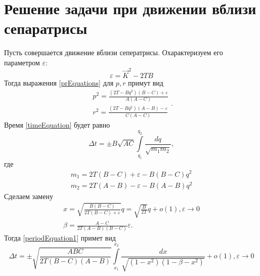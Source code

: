 \documentclass{article}
\begin{document}
\section{Решение задачи при движении вблизи сепаратрисы}
Пусть совершается движение вблизи сеператрисы. Охарактеризуем его параметром \begin{math} \varepsilon \end{math}:
\begin{equation}
\varepsilon=\vec{K}^2-2TB
\end{equation}
Тогда выражения \ref{prEquations} для \begin{math} p, r \end{math} примут вид
\begin{equation}
\begin{array}{l}
p^2=\frac{(2T-Bq^2)(B-C)+\varepsilon}{A(A-C)}\\
r^2=\frac{(2T-Bq^2)(A-B)-\varepsilon}{C(A-C)}
\end{array}.
\end{equation}
Время \ref{timeEquation} будет равно
\begin{equation}
\label{periodEquation1}
\Delta t=\pm B\sqrt{AC}{\int\limits_{q_1}^{q_2}\frac{dq}{\sqrt{m_1m_2}}},
\end{equation}
где
\begin{equation}
\begin{array}{clr}
m_1=2T(B-C)+\varepsilon-B(B-C)q^2\\
m_2=2T(A-B)-\varepsilon-B(A-B)q^2
\end{array}
\end{equation}
Сделаем замену
\begin{equation}
\begin{array}{l}
x=\sqrt{\frac{B(B-C)}{2T(B-C)+\varepsilon}}q=\sqrt{\frac{B}{2T}}q+o(1), \varepsilon\rightarrow 0\\
\beta=\frac{A-C}{2T(A-B)(B-C)}\varepsilon.
\end{array}
\end{equation}
Тогда \ref{periodEquation1} примет вид
\begin{equation}
\label{timeFinalEquation}
\Delta t=\pm \sqrt{\frac{ABC}{2T(B-C)(A-B)}}{\int\limits_{x_1}^{x_2}\frac{dx}{\sqrt{(1-x^2)(1-\beta-x^2)}}}+o(1),\varepsilon\rightarrow 0
\end{equation}
\end{document}
